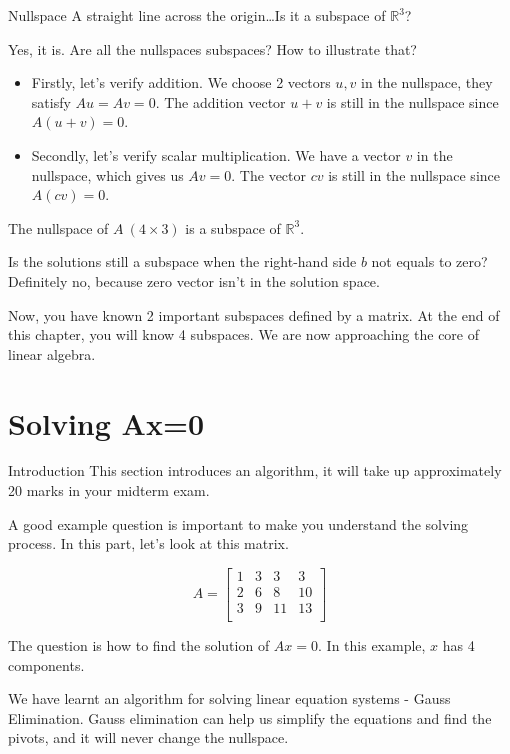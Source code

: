 \documentclass{beamer}
\begin{document}
\begin{frame}{Nullspace}
A straight line across the origin\dots Is it a subspace of $\mathbb{R}^3$?

\vspace{3pt}
Yes, it is. Are all the nullspaces subspaces? How to illustrate that?

\begin{itemize}
    \item Firstly, let's verify addition. We choose 2 vectors $u,v$ in the nullspace, they satisfy $Au=Av=0$. The addition vector $u+v$ is still in the nullspace since $A(u+v)=0$.
    \item Secondly, let's verify scalar multiplication. We have a vector $v$ in the nullspace, which gives us $Av=0$. The vector $cv$ is still in the nullspace since $A(cv)=0$.
\end{itemize}

The nullspace of $A\:(4\times3)$ is a subspace of $\mathbb{R}^3$.

\vspace{3pt}
Is the solutions still a subspace when the right-hand side $b$ not equals to zero? Definitely no, because zero vector isn't in the solution space.

\vspace{3pt}
Now, you have known 2 important subspaces defined by a matrix. At the end of this chapter, you will know 4 subspaces. We are now approaching the core of linear algebra.

\end{frame}

\section{Solving Ax=0}
\begin{frame}{Introduction}
This section introduces an algorithm, it will take up approximately 20 marks in your midterm exam.

\vspace{3pt}
A good example question is important to make you understand the solving process. In this part, let's look at this matrix.

\begin{equation*}
    A=\left[ \begin{matrix}
        1&		3&		3&		3\\
        2&		6&		8&		10\\
        3&		9&		11&		13\\
    \end{matrix} \right]
\end{equation*}

The question is how to find the solution of $Ax=0$. In this example, $x$ has 4 components.

\vspace{3pt}
We have learnt an algorithm for solving linear equation systems - Gauss Elimination. Gauss elimination can help us simplify the equations and find the pivots, and it will never change the nullspace.
\end{frame}
\end{document}
